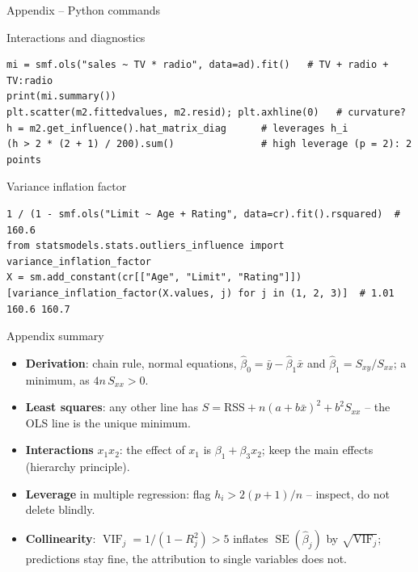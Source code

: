 \documentclass[aspectratio=169,11pt]{beamer}
\begin{document}
\begin{frame}[fragile]{Appendix -- Python commands}
  \begin{block}{Interactions and diagnostics}
\begin{lstlisting}
mi = smf.ols("sales ~ TV * radio", data=ad).fit()   # TV + radio + TV:radio
print(mi.summary())
plt.scatter(m2.fittedvalues, m2.resid); plt.axhline(0)   # curvature?
h = m2.get_influence().hat_matrix_diag      # leverages h_i
(h > 2 * (2 + 1) / 200).sum()               # high leverage (p = 2): 2 points
\end{lstlisting}
  \end{block}
  \begin{block}{Variance inflation factor}
\begin{lstlisting}
1 / (1 - smf.ols("Limit ~ Age + Rating", data=cr).fit().rsquared)  # 160.6
from statsmodels.stats.outliers_influence import variance_inflation_factor
X = sm.add_constant(cr[["Age", "Limit", "Rating"]])
[variance_inflation_factor(X.values, j) for j in (1, 2, 3)]  # 1.01 160.6 160.7
\end{lstlisting}
  \end{block}
\end{frame}

\begin{frame}{Appendix summary}
  \begin{itemize}\setlength{\itemsep}{5pt}
    \item \textbf{Derivation}: chain rule, normal equations,
          $\hat\beta_0=\bar y-\hat\beta_1\bar x$ and
          $\hat\beta_1=S_{xy}/S_{xx}$; a minimum, as $4n\,S_{xx}>0$.
    \item \textbf{Least squares}: any other line has
          $S=\text{RSS}+n(a+b\bar x)^2+b^2S_{xx}$ -- the OLS line is the unique
          minimum.
    \item \textbf{Interactions} $x_1x_2$: the effect of $x_1$ is
          $\beta_1+\beta_3x_2$; keep the main effects (hierarchy principle).
    \item \textbf{Leverage} in multiple regression: flag $h_i>2(p+1)/n$ --
          inspect, do not delete blindly.
    \item \textbf{Collinearity}: $\operatorname{VIF}_j=1/(1-R_j^2)>5$
          inflates $\operatorname{SE}(\hat\beta_j)$ by $\sqrt{\operatorname{VIF}_j}$;
          predictions stay fine, the attribution to single variables does not.
  \end{itemize}
\end{frame}
\end{document}
